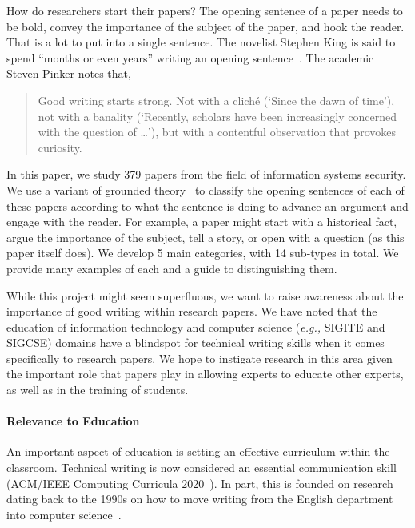 \documentclass[sigconf,anonymous]{acmart}
\newcommand{\eg}{\textit{e.g.,}\xspace}
\begin{document}
How do researchers start their papers? The opening sentence of a paper needs to be bold, convey the importance of the subject of the paper, and hook the reader. That is a lot to put into a single sentence. The novelist Stephen King is said to spend ``months or even years'' writing an opening sentence~\cite{Fas13}. The academic Steven Pinker notes that,

\begin{quote}
Good writing starts strong. Not with a cliché (`Since the dawn of time’), not with a banality (`Recently, scholars have been increasingly concerned with the question of …’), but with a contentful observation that provokes curiosity.~\cite{Pin15}
\end{quote}

In this paper, we study 379 papers from the field of information systems security. We use a variant of grounded theory~\cite{glaser1968discovery} to classify the opening sentences of each of these papers according to what the sentence is doing to advance an argument and engage with the reader. For example, a paper might start with a historical fact, argue the importance of the subject, tell a story, or open with a question (as this paper itself does). We develop 5 main categories, with 14 sub-types in total. We provide many examples of each and a guide to distinguishing them.

While this project might seem superfluous, we want to raise awareness about the importance of good writing within research papers. We have noted that the education of information technology and computer science (\eg SIGITE and SIGCSE) domains have a blindspot for technical writing skills when it comes specifically to research papers. We hope to instigate research in this area given the important role that papers play in allowing experts to educate other experts, as well as in the training of students.
	
\paragraph{Relevance to Education}

An important aspect of education is setting an effective curriculum within the classroom. Technical writing is now considered an essential communication skill (ACM/IEEE Computing Curricula 2020~\cite{CC2020,CC2020report}). In part, this is founded on research dating back to the 1990s on how to move writing from the English department into computer science~\cite{Pes91,TP93,FPC96,Kay98}.
\end{document}
